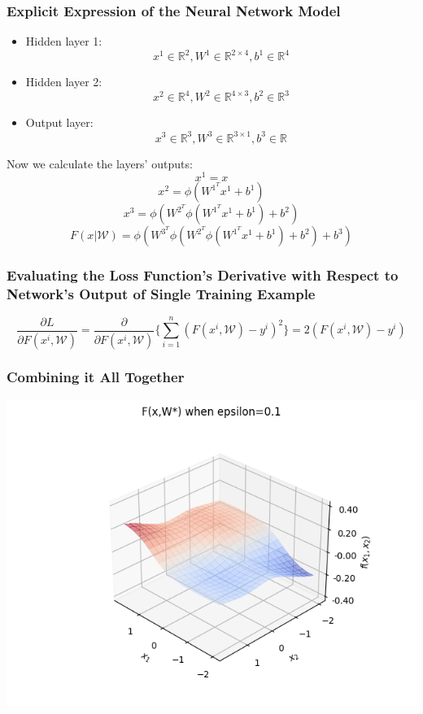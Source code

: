 \documentclass[12pt]{article}
\begin{document}
\subsubsection{Explicit Expression of the Neural Network Model}
\begin{itemize}
    \item Hidden layer 1:\\
$$x^1\in \mathbb{R}^{2}, W^1 \in \mathbb{R}^{2\times 4}, b^1\in \mathbb{R}^{4} $$
    \item Hidden layer 2:\\
$$x^2\in \mathbb{R}^{4}, W^2 \in \mathbb{R}^{4\times 3},  b^2\in \mathbb{R}^{3} $$
    \item Output layer:\\
$$x^3\in \mathbb{R}^{3}, W^3 \in \mathbb{R}^{3\times 1},  b^3\in \mathbb{R} $$
\end{itemize}
Now we calculate the layers' outputs:\\
$$x^1 = x$$
$$x^2 = \phi( W^{1^T} x^1 + b^1 )$$
$$x^3 = \phi( W^{2^T} \phi( W^{1^T} x^1 + b^1 ) + b^2)$$
$$F\left(x \vert \mathcal{W}\right) = \phi( W^{3^T} \phi( W^{2^T} \phi( W^{1^T} x^1 + b^1 ) + b^2) + b^3)$$
\subsubsection{Evaluating  the  Loss  Function’s  Derivative  with  Respect  to  Network’s Output of Single Training Example}
$$\frac{\partial L}{\partial F\left(x^i, \mathcal{W} \right)} = \frac{\partial }{\partial F\left(x^i, \mathcal{W} \right)}\{ \sum_{i=1}^{n} (F(x^i , \mathcal{W}) - y^i )^2\} = 2 (F(x^i , \mathcal{W}) - y^i)$$
\subsubsection{ Combining it All Together}
\includegraphics[]{model_approx_epsilon_0.png}\\
\end{document}
